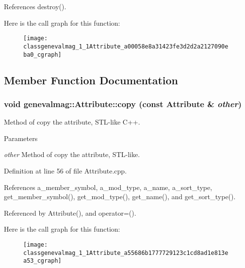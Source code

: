 References destroy().



Here is the call graph for this function:\nopagebreak
\begin{figure}[H]
\begin{center}
\leavevmode
\texttt{[image: classgenevalmag\_1\_1Attribute\_a00058e8a31423fe3d2d2a2127090eba0\_cgraph]}
\end{center}
\end{figure}




\subsection{Member Function Documentation}
\hypertarget{classgenevalmag_1_1Attribute_a55686b1777729123c1cd8ad1e813ea53}{
\subsubsection[{copy}]{\setlength{\rightskip}{0pt plus 5cm}void genevalmag::Attribute::copy (const {\bf Attribute} \& {\em other})}}
\label{classgenevalmag_1_1Attribute_a55686b1777729123c1cd8ad1e813ea53}
Method of copy the attribute, STL-\/like C++. 
\begin{DoxyParams}{Parameters}
\item[{\em other}]Method of copy the attribute, STL-\/like. \end{DoxyParams}


Definition at line 56 of file Attribute.cpp.



References a\_\-member\_\-symbol, a\_\-mod\_\-type, a\_\-name, a\_\-sort\_\-type, get\_\-member\_\-symbol(), get\_\-mod\_\-type(), get\_\-name(), and get\_\-sort\_\-type().



Referenced by Attribute(), and operator=().



Here is the call graph for this function:\nopagebreak
\begin{figure}[H]
\begin{center}
\leavevmode
\texttt{[image: classgenevalmag\_1\_1Attribute\_a55686b1777729123c1cd8ad1e813ea53\_cgraph]}
\end{center}
\end{figure}




